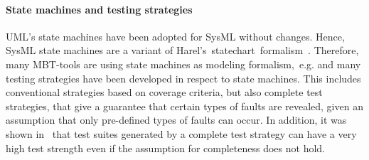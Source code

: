 \paragraph{State machines and testing strategies}
UML's state machines have been adopted for SysML without changes. Hence, SysML state machines are
a variant of Harel's~statechart~formalism~\cite{harel96}. Therefore, many
MBT-tools are using state machines as modeling
formalism,~e.g.\cite{ali_searchbased_2011, bouquet_subset_2007} and many testing
strategies have been developed in respect to state machines. This includes
conventional strategies based on coverage criteria, but also complete test
strategies, that give a guarantee that certain types of faults are revealed,
given an assumption that only pre-defined types of faults can occur. In
addition, it was shown in~\cite{hubner_experimental_2015} that test suites
generated by a complete test strategy can have a very high test strength even if
the assumption for completeness does not hold.

